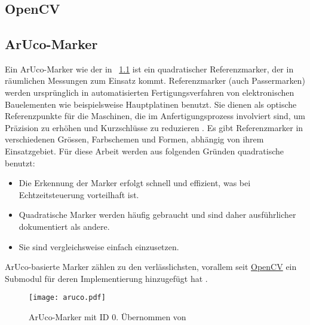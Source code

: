 \chapter{\chapTwo}
\label{sec:kapitel2} %

\begingroup
\fontsize{12pt}{14pt}\selectfont

\section{OpenCV}
\label{sec:opencv} %
\blindtext

\section{ArUco-Marker}
Ein ArUco-Marker wie der in \figurename~\ref{fig:marker0} ist ein quadratischer Referenzmarker, der in räumlichen Messungen zum Einsatz kommt. Referenzmarker (auch Passermarken) werden ursprünglich in automatisierten Fertigungsverfahren von elektronischen Bauelementen wie beispielsweise Hauptplatinen benutzt. Sie dienen als optische Referenzpunkte für die Maschinen, die im Anfertigungsprozess involviert sind, um Präzision zu erhöhen und Kurzschlüsse zu reduzieren \cite{Wiki:Passermarke}. 
Es gibt Referenzmarker in verschiedenen Grössen, Farbschemen und Formen, abhängig von ihrem Einsatzgebiet. Für diese Arbeit werden aus folgenden Gründen quadratische benutzt:

\begin{itemize}
  \item Die Erkennung der Marker erfolgt schnell und effizient, was bei Echtzeitsteuerung vorteilhaft ist.
  \item Quadratische Marker werden häufig gebraucht und sind daher ausführlicher dokumentiert als andere.
  \item Sie sind vergleichsweise einfach einzusetzen.
\end{itemize}

ArUco-basierte Marker zählen zu den verlässlichsten, vorallem seit \hyperref[sec:opencv]{OpenCV} ein Submodul für deren Implementierung hinzugefügt hat \cite{IJ:fiducial}.

\begin{figure}[H]
    \begin{center}
        \texttt{[image: aruco.pdf]}
    \end{center}
    \caption{ArUco-Marker mit ID 0. Übernommen von \cite{chev:arucogen}}\label{fig:marker0}
\end{figure}

